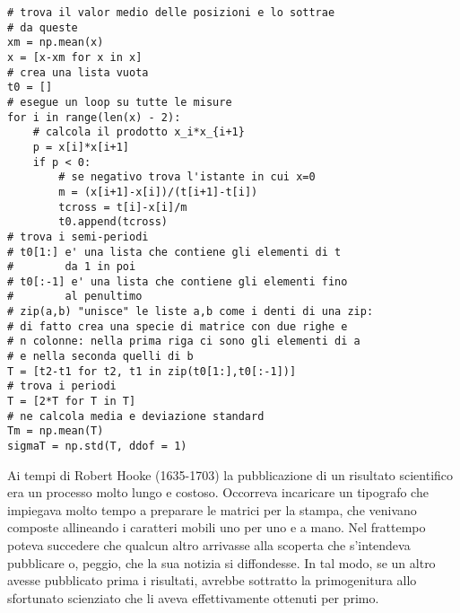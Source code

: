 \documentclass[12pt, a4paper]{physathome}   	%
\begin{document}
\lstset{language = Python}
\begin{lstlisting}
# trova il valor medio delle posizioni e lo sottrae                                                             
# da queste                                                                                                     
xm = np.mean(x)
x = [x-xm for x in x]
# crea una lista vuota                                                                                          
t0 = []
# esegue un loop su tutte le misure                                                                             
for i in range(len(x) - 2):
    # calcola il prodotto x_i*x_{i+1}                                                                           
    p = x[i]*x[i+1]
    if p < 0:
        # se negativo trova l'istante in cui x=0                                                                
        m = (x[i+1]-x[i])/(t[i+1]-t[i])
        tcross = t[i]-x[i]/m
        t0.append(tcross)
# trova i semi-periodi                                                                                          
# t0[1:] e' una lista che contiene gli elementi di t 
#        da 1 in poi                                                
# t0[:-1] e' una lista che contiene gli elementi fino                                                           
#        al penultimo                              
# zip(a,b) "unisce" le liste a,b come i denti di una zip:
# di fatto crea una specie di matrice con due righe e 
# n colonne: nella prima riga ci sono gli elementi di a
# e nella seconda quelli di b                                                            
T = [t2-t1 for t2, t1 in zip(t0[1:],t0[:-1])]
# trova i periodi                                                                                               
T = [2*T for T in T]
# ne calcola media e deviazione standard                                                                        
Tm = np.mean(T)
sigmaT = np.std(T, ddof = 1)
\end{lstlisting}

Ai tempi di Robert Hooke (1635-1703) la pubblicazione di un risultato scientifico era un processo molto lungo e costoso. Occorreva incaricare un tipografo che impiegava molto tempo a preparare le matrici per la stampa, che venivano composte allineando i caratteri mobili uno per uno e a mano. Nel frattempo poteva succedere che qualcun altro arrivasse alla scoperta che s'intendeva pubblicare o, peggio, che la sua notizia si diffondesse. In tal modo, se un altro avesse pubblicato prima i risultati, avrebbe sottratto la primogenitura allo sfortunato scienziato che li aveva effettivamente ottenuti per primo.
\end{document}
